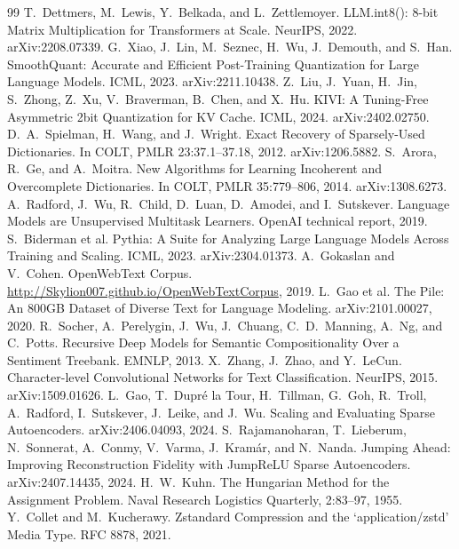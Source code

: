 \documentclass{article}
\begin{document}
\begin{thebibliography}{99}
 T.~Dettmers, M.~Lewis, Y.~Belkada, and L.~Zettlemoyer.
\newblock LLM.int8(): 8-bit Matrix Multiplication for Transformers at
Scale.
\newblock NeurIPS, 2022. arXiv:2208.07339.
 G.~Xiao, J.~Lin, M.~Seznec, H.~Wu, J.~Demouth, and
S.~Han.
\newblock SmoothQuant: Accurate and Efficient Post-Training Quantization
for Large Language Models.
\newblock ICML, 2023. arXiv:2211.10438.
 Z.~Liu, J.~Yuan, H.~Jin, S.~Zhong, Z.~Xu, V.~Braverman,
B.~Chen, and X.~Hu.
\newblock KIVI: A Tuning-Free Asymmetric 2bit Quantization for KV Cache.
\newblock ICML, 2024. arXiv:2402.02750.
 D.~A.~Spielman, H.~Wang, and J.~Wright.
\newblock Exact Recovery of Sparsely-Used Dictionaries.
\newblock In COLT, PMLR 23:37.1--37.18, 2012. arXiv:1206.5882.
 S.~Arora, R.~Ge, and A.~Moitra.
\newblock New Algorithms for Learning Incoherent and Overcomplete
Dictionaries.
\newblock In COLT, PMLR 35:779--806, 2014. arXiv:1308.6273.
 A.~Radford, J.~Wu, R.~Child, D.~Luan, D.~Amodei, and
I.~Sutskever.
\newblock Language Models are Unsupervised Multitask Learners.
\newblock OpenAI technical report, 2019.
 S.~Biderman et al.
\newblock Pythia: A Suite for Analyzing Large Language Models Across
Training and Scaling.
\newblock ICML, 2023. arXiv:2304.01373.
 A.~Gokaslan and V.~Cohen.
\newblock OpenWebText Corpus.
\newblock \url{http://Skylion007.github.io/OpenWebTextCorpus}, 2019.
 L.~Gao et al.
\newblock The Pile: An 800GB Dataset of Diverse Text for Language
Modeling.
\newblock arXiv:2101.00027, 2020.
 R.~Socher, A.~Perelygin, J.~Wu, J.~Chuang, C.~D.~Manning,
A.~Ng, and C.~Potts.
\newblock Recursive Deep Models for Semantic Compositionality Over a
Sentiment Treebank.
\newblock EMNLP, 2013.
 X.~Zhang, J.~Zhao, and Y.~LeCun.
\newblock Character-level Convolutional Networks for Text
Classification.
\newblock NeurIPS, 2015. arXiv:1509.01626.
 L.~Gao, T.~Dupr\'e la Tour, H.~Tillman, G.~Goh, R.~Troll,
A.~Radford, I.~Sutskever, J.~Leike, and J.~Wu.
\newblock Scaling and Evaluating Sparse Autoencoders.
\newblock arXiv:2406.04093, 2024.
 S.~Rajamanoharan, T.~Lieberum, N.~Sonnerat, A.~Conmy,
V.~Varma, J.~Kram\'ar, and N.~Nanda.
\newblock Jumping Ahead: Improving Reconstruction Fidelity with JumpReLU
Sparse Autoencoders.
\newblock arXiv:2407.14435, 2024.
 H.~W.~Kuhn.
\newblock The Hungarian Method for the Assignment Problem.
\newblock Naval Research Logistics Quarterly, 2:83--97, 1955.
 Y.~Collet and M.~Kucherawy.
\newblock Zstandard Compression and the `application/zstd' Media Type.
\newblock RFC 8878, 2021.
\end{thebibliography}
\end{document}
